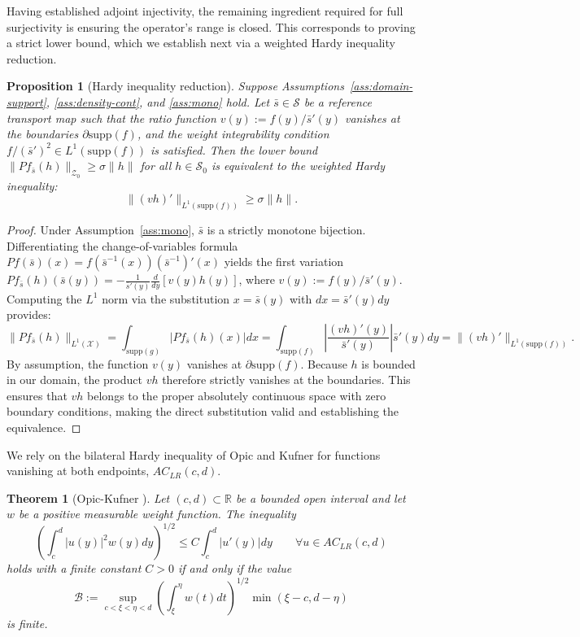 \documentclass[12pt,leqno]{amsart}
\newtheorem{theorem}{Theorem}
\newtheorem{proposition}{Proposition}
\begin{document}
Having established adjoint injectivity, the remaining ingredient required for full surjectivity is ensuring the operator's range is closed. This corresponds to proving a strict lower bound, which we establish next via a weighted Hardy inequality reduction.

\begin{proposition}[Hardy inequality reduction]\label{prop:hardy-reduction}
Suppose Assumptions~\ref{ass:domain-support}, \ref{ass:density-cont}, and \ref{ass:mono} hold. Let $\bar{s} \in \mathcal{S}$ be a reference transport map such that the ratio function $v(y) := f(y)/\bar{s}'(y)$ vanishes at the boundaries $\partial \mathrm{supp}(f)$, and the weight integrability condition $f/(\bar{s}')^2 \in L^1(\mathrm{supp}(f))$ is satisfied. Then the lower bound $\|Pf_{\bar{s}}(h)\|_{\mathcal{Z}_0} \ge \sigma\|h\|$ for all $h\in\mathcal{S}_0$ is equivalent to the weighted Hardy inequality:
\[
\|(v h)'\|_{L^1(\mathrm{supp}(f))} \ge \sigma\|h\|.
\]
\end{proposition}
\begin{proof}
Under Assumption~\ref{ass:mono}, $\bar{s}$ is a strictly monotone bijection. Differentiating the change-of-variables formula $Pf(\bar{s})(x) = f(\bar{s}^{-1}(x))(\bar{s}^{-1})'(x)$ yields the first variation $Pf_{\bar{s}}(h)(\bar{s}(y)) = -\frac{1}{\bar{s}'(y)}\frac{d}{dy}[v(y)h(y)]$, where $v(y) := f(y)/\bar{s}'(y)$. Computing the $L^1$ norm via the substitution $x = \bar{s}(y)$ with $dx = \bar{s}'(y)dy$ provides:
\[
\|Pf_{\bar{s}}(h)\|_{L^1(\mathcal{X})} = \int_{\mathrm{supp}(g)} |Pf_{\bar{s}}(h)(x)|dx = \int_{\mathrm{supp}(f)} \left|\frac{(v h)'(y)}{\bar{s}'(y)}\right|\bar{s}'(y)dy = \|(v h)'\|_{L^1(\mathrm{supp}(f))}.
\]
By assumption, the function $v(y)$ vanishes at $\partial \mathrm{supp}(f)$. Because $h$ is bounded in our domain, the product $v h$ therefore strictly vanishes at the boundaries. This ensures that $vh$ belongs to the proper absolutely continuous space with zero boundary conditions, making the direct substitution valid and establishing the equivalence.
\end{proof}

We rely on the bilateral Hardy inequality of Opic and Kufner for functions vanishing at both endpoints, $AC_{LR}(c,d)$.
\begin{theorem}[Opic-Kufner \cite{opic1990hardy}]\label{thm:opic-kufner}
Let $(c,d) \subset \mathbb{R}$ be a bounded open interval and let $w$ be a positive measurable weight function. The inequality
\[
\left(\int_c^d |u(y)|^2 w(y) dy\right)^{1/2} \le C \int_c^d |u'(y)| dy \qquad \forall u \in AC_{LR}(c,d)
\]
holds with a finite constant $C>0$ if and only if the value
\[
\mathcal{B} := \sup_{c < \xi < \eta < d} \left(\int_\xi^\eta w(t)dt\right)^{1/2} \min(\xi-c, d-\eta)
\]
is finite.
\end{theorem}
\end{document}
